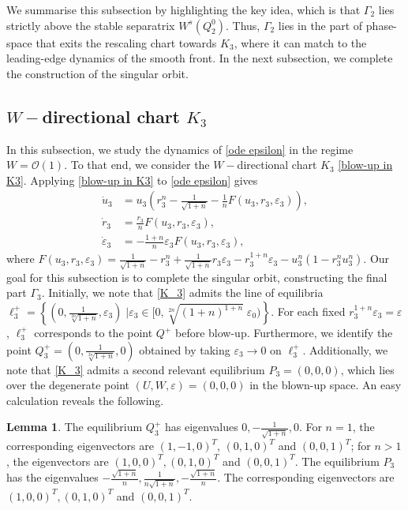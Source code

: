 \documentclass{article}
\theoremstyle{definition}
\numberwithin{equation}{section}
\newtheorem{lem}[prop]{Lemma}
\begin{document}
We summarise this subsection by highlighting the key idea, which is that $\Gamma_2$ lies strictly above the stable separatrix $W^s(Q_2^0)$.
Thus, $\Gamma_2$ lies in the part of phase-space that exits the rescaling chart towards $K_3$, where it can match to the leading-edge dynamics of the smooth front. In the next subsection, we complete the construction of the singular orbit. 

\subsection{$W-$directional chart $K_3$}
In this subsection, we study the dynamics of \eqref{ode epsilon} in the regime $W=\mathcal{O}(1)$. To that end, we consider the $W-$directional chart $K_3$ \eqref{blow-up in K3}.
Applying \eqref{blow-up in K3} to \eqref{ode epsilon} gives 
\begin{equation}
    \begin{aligned}
        \dot{u}_3&=u_3\left(r_3^n-\tfrac{1}{\sqrt{1+n}}-\tfrac{1}{n}F(u_3, r_3, \varepsilon_3)\right),\\
        \dot{r}_3&=\tfrac{r_3}{n} F(u_3, r_3, \varepsilon_3),\\
        \dot{\varepsilon}_3&=-\tfrac{1+n}{n}\varepsilon_3 F(u_3, r_3, \varepsilon_3),
        \label{K_3}
    \end{aligned}
\end{equation}
where $F(u_3, r_3, \varepsilon_3)=\tfrac{1}{\sqrt{1+n}}-r_3^n+\tfrac{1}{\sqrt{1+n}}r_3\varepsilon_3-r_3^{1+n}\varepsilon_3-u_3^n(1-r_3^nu_3^n)$.
Our goal for this subsection is to complete the singular orbit, constructing the final part $\Gamma_3$.
Initially, we note that \eqref{K_3} admits the line of equilibria $\ell_3^+=\left\{\left(0, \tfrac{1}{\sqrt[2n]{1+n}}, \varepsilon_3\right)\;\big|\varepsilon_3\in[0, \sqrt[2n]{(1+n)^{1+n}}\;\varepsilon_0)\right\}$. For each fixed $r_3^{1+n}\varepsilon_3=\varepsilon$, $\ell_3^+$ corresponds to the point $Q^+$ before blow-up. Furthermore, we identify the point $Q_3^+=\left(0, \tfrac{1}{\sqrt[2n]{1+n}}, 0\right)$ obtained by taking $\varepsilon_3\to0$ on $\ell_3^+$. Additionally, we note that \eqref{K_3} admits a second relevant equilibrium $P_3=(0,0,0)$, which lies over the degenerate point $(U,W,\varepsilon)=(0,0,0)$ in the blown-up space. An easy calculation reveals the following.
\begin{lem}
    The equilibrium $Q_3^+$ has eigenvalues $0, -\tfrac{1}{\sqrt{1+n}}, 0$. For $n=1$, the corresponding eigenvectors are $(1, -1, 0)^T$, $(0,1,0)^T$ and $(0,0,1)^T$; for $n>1$, the eigenvectors are $(1,0,0)^T, (0,1,0)^T$ and $(0,0,1)^T$.
    The equilibrium $P_3$ has the eigenvalues $-\tfrac{\sqrt{1+n}}{n},\tfrac{1}{n\sqrt{1+n}},-\tfrac{\sqrt{1+n}}{n}$. The corresponding eigenvectors are $(1,0,0)^T, (0,1,0)^T$ and $(0,0,1)^T$.
    \label{lem: K_3 lin}
\end{lem}
\end{document}
